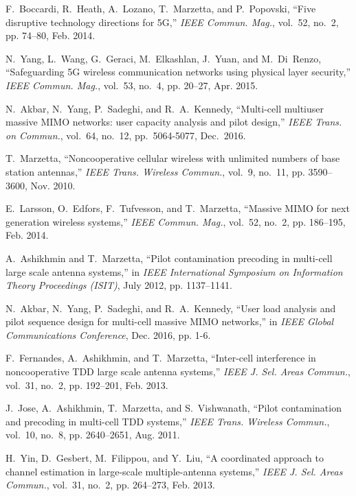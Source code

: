 \documentclass[conference]{IEEEtran}
\begin{document}
\begin{thebibliography}{17}
F.~Boccardi, R.~Heath, A.~Lozano, T.~Marzetta, and P.~Popovski, ``Five disruptive technology directions for {5G},'' \emph{{IEEE} Commun. Mag.}, vol.~52, no.~2, pp. 74--80, Feb. 2014.

N.~Yang, L.~Wang, G.~Geraci, M.~Elkashlan, J.~Yuan, and M.~Di~Renzo, ``Safeguarding {5G} wireless communication networks using physical layer security,'' \emph{{IEEE} Commun. Mag.}, vol.~53, no.~4, pp. 20--27, Apr. 2015.

N.~Akbar, N.~Yang, P.~Sadeghi, and R.~A.~Kennedy, ``Multi-cell multiuser massive MIMO networks: user capacity analysis and pilot design,'' \emph{IEEE Trans. on Commun.}, vol.~64, no.~12, pp.~5064-5077, Dec.~2016.

T.~Marzetta, ``Noncooperative cellular wireless with unlimited numbers of base station antennas,'' \emph{{IEEE} Trans. Wireless Commun.}, vol.~9, no.~11, pp. 3590--3600, Nov. 2010.

E.~Larsson, O.~Edfors, F.~Tufvesson, and T.~Marzetta, ``Massive {MIMO} for next generation wireless systems,'' \emph{{IEEE} Commun. Mag.}, vol.~52, no.~2, pp. 186--195, Feb. 2014.

A.~Ashikhmin and T.~Marzetta, ``Pilot contamination precoding in multi-cell large scale antenna systems,'' in \emph{IEEE International Symposium on Information Theory Proceedings (ISIT)}, July 2012, pp. 1137--1141.

N.~Akbar, N.~Yang, P.~Sadeghi, and R.~A.~Kennedy, ``User load analysis and pilot sequence design for multi-cell massive MIMO networks,'' in \emph{IEEE Global Communications Conference}, Dec. 2016, pp. 1-6.

F.~Fernandes, A.~Ashikhmin, and T.~Marzetta, ``Inter-cell interference in noncooperative {TDD} large scale antenna systems,'' \emph{{IEEE} J. Sel. Areas Commun.}, vol.~31, no.~2, pp. 192--201, Feb. 2013.

J.~Jose, A.~Ashikhmin, T.~Marzetta, and S.~Vishwanath, ``Pilot contamination and precoding in multi-cell {TDD} systems,'' \emph{{IEEE} Trans. Wireless Commun.}, vol.~10, no.~8, pp. 2640--2651, Aug. 2011.

H.~Yin, D.~Gesbert, M.~Filippou, and Y.~Liu, ``A coordinated approach to channel estimation in large-scale multiple-antenna systems,'' \emph{{IEEE} J. Sel. Areas Commun.}, vol.~31, no.~2, pp. 264--273, Feb. 2013.


\end{thebibliography}
\end{document}
